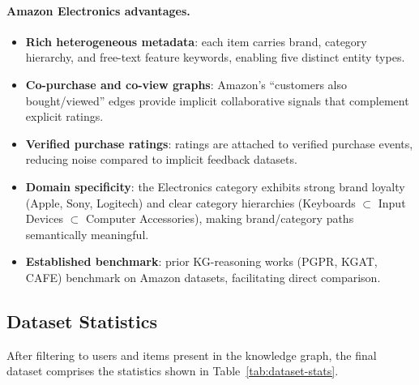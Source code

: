 \documentclass[12pt,a4paper]{article}
\begin{document}
\paragraph{Amazon Electronics advantages.}
\begin{itemize}[leftmargin=2em]
  \item \textbf{Rich heterogeneous metadata}: each item carries brand, category
        hierarchy, and free-text feature keywords, enabling five distinct entity types.
  \item \textbf{Co-purchase and co-view graphs}: Amazon's ``customers also bought/viewed''
        edges provide implicit collaborative signals that complement explicit ratings.
  \item \textbf{Verified purchase ratings}: ratings are attached to verified purchase
        events, reducing noise compared to implicit feedback datasets.
  \item \textbf{Domain specificity}: the Electronics category exhibits strong brand
        loyalty (Apple, Sony, Logitech) and clear category hierarchies
        (Keyboards $\subset$ Input Devices $\subset$ Computer Accessories),
        making brand/category paths semantically meaningful.
  \item \textbf{Established benchmark}: prior KG-reasoning works (PGPR, KGAT, CAFE)
        benchmark on Amazon datasets, facilitating direct comparison.
\end{itemize}

\subsection{Dataset Statistics}

After filtering to users and items present in the knowledge graph, the final
dataset comprises the statistics shown in Table~\ref{tab:dataset-stats}.
\end{document}
